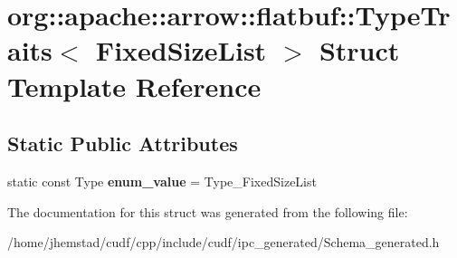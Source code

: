 \hypertarget{structorg_1_1apache_1_1arrow_1_1flatbuf_1_1TypeTraits_3_01FixedSizeList_01_4}{}\section{org\+:\+:apache\+:\+:arrow\+:\+:flatbuf\+:\+:Type\+Traits$<$ Fixed\+Size\+List $>$ Struct Template Reference}
\label{structorg_1_1apache_1_1arrow_1_1flatbuf_1_1TypeTraits_3_01FixedSizeList_01_4}
\subsection*{Static Public Attributes}
\begin{DoxyCompactItemize}
\item 
static const Type {\bfseries enum\+\_\+value} = Type\+\_\+\+Fixed\+Size\+List\hypertarget{structorg_1_1apache_1_1arrow_1_1flatbuf_1_1TypeTraits_3_01FixedSizeList_01_4_a84fba4411cb5d80bd8f8132e07b96c86}{}\label{structorg_1_1apache_1_1arrow_1_1flatbuf_1_1TypeTraits_3_01FixedSizeList_01_4_a84fba4411cb5d80bd8f8132e07b96c86}

\end{DoxyCompactItemize}


The documentation for this struct was generated from the following file\+:\begin{DoxyCompactItemize}
\item 
/home/jhemstad/cudf/cpp/include/cudf/ipc\+\_\+generated/Schema\+\_\+generated.\+h\end{DoxyCompactItemize}
